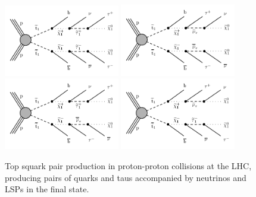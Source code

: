 \documentclass[12pt, a4paper]{article}
\DeclareRobustCommand{\PQb}{{\HepParticle{b}{}{}}\xspace} %
\begin{document}
\begin{figure}[!htbp]
	\centering
	
	\includegraphics[width=0.45\textwidth]{Fig/Figure_001-a.pdf}
	\includegraphics[width=0.45\textwidth]{Fig/Figure_001-b.pdf} \\
	\includegraphics[width=0.45\textwidth]{Fig/Figure_001-c.pdf}
	\includegraphics[width=0.45\textwidth]{Fig/Figure_001-d.pdf}
	
	\caption{Top squark pair production in proton-proton collisions at the LHC, producing pairs of \PQb quarks and taus accompanied by neutrinos and LSPs in the final state.
	}
	\label{fig:sigFeyn}
\end{figure}
\end{document}
